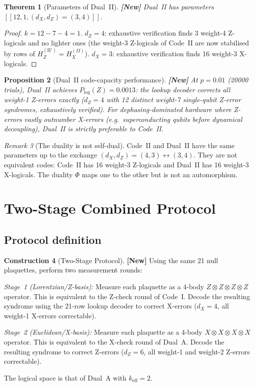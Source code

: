\documentclass[12pt,a4paper]{article}
\theoremstyle{plain}
\newtheorem{theorem}{Theorem}[section]
\newtheorem{proposition}[theorem]{Proposition}
\theoremstyle{definition}
\newtheorem{construction}[theorem]{Construction}
\theoremstyle{remark}
\newtheorem{remark}[theorem]{Remark}
\newcommand{\NEW}{\textcolor{newcolor}{\textbf{[New]}}}
\begin{document}
\begin{theorem}[Parameters of Dual~II]\label{thm:dualII}
\NEW\; Dual~II has parameters $[[12, 1, (d_X,d_Z)=(3,4)]]$.
\end{theorem}
\begin{proof}
$k = 12 - 7 - 4 = 1$.
$d_Z = 4$: exhaustive verification finds 3 weight-4 Z-logicals and no
lighter ones (the weight-3 Z-logicals of Code~II are now stabilised by
rows of $H_Z^{(\mathrm{II}')} = H_X^{(II)}$).
$d_X = 3$: exhaustive verification finds 16 weight-3 X-logicals.
\end{proof}

\begin{proposition}[Dual~II code-capacity performance]\label{prop:dualII_perf}
\NEW\;
At $p = 0.01$ (20000 trials), Dual~II achieves
$P_{\log}(Z) = 0.0013$: the lookup decoder corrects all weight-1
Z-errors exactly ($d_Z = 4$ with 12 distinct weight-7 single-qubit
Z-error syndromes, exhaustively verified).
For dephasing-dominated hardware where Z-errors vastly outnumber X-errors
(e.g.\ superconducting qubits before dynamical decoupling), Dual~II is
strictly preferable to Code~II.
\end{proposition}

\begin{remark}[The duality is not self-dual]
Code~II and Dual~II have the same parameters up to the exchange
$(d_X,d_Z) = (4,3) \leftrightarrow (3,4)$.
They are not equivalent codes: Code~II has 16 weight-3 Z-logicals and
Dual~II has 16 weight-3 X-logicals.
The duality $\Phi$ maps one to the other but is not an automorphism.
\end{remark}

\section{Two-Stage Combined Protocol}\label{sec:twostage}

\subsection{Protocol definition}

\begin{construction}[Two-Stage Protocol]\label{con:twostage}
\NEW\;
Using the same 21 null plaquettes, perform two measurement rounds:

\emph{Stage~1 (Lorentzian/Z-basis):}
Measure each plaquette as a 4-body $Z\otimes Z\otimes Z\otimes Z$
operator. This is equivalent to the Z-check round of Code~I.
Decode the resulting syndrome using the 21-row lookup decoder to
correct X-errors ($d_X=4$, all weight-1 X-errors correctable).

\emph{Stage~2 (Euclidean/X-basis):}
Measure each plaquette as a 4-body $X\otimes X\otimes X\otimes X$
operator. This is equivalent to the X-check round of Dual~A.
Decode the resulting syndrome to correct Z-errors
($d_Z=6$, all weight-1 and weight-2 Z-errors correctable).

The logical space is that of Dual~A with $k_{\mathrm{eff}} = 2$.
\end{construction}
\end{document}
